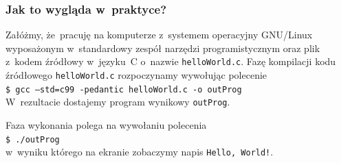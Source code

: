 \documentclass[10pt,t]{beamer}
\begin{document}
\begin{frame}
  \frametitle{Jak to wygląda w~praktyce?}


  Załóżmy, że~pracuję na komputerze z~systemem operacyjny GNU/Linux
  wyposażonym w~standardowy zespół narzędzi programistycznym oraz plik
  z~kodem źródłowy w~języku~C o~nazwie \texttt{helloWorld.c}. Fazę
  kompilacji kodu źródłowego \texttt{helloWorld.c} rozpoczynamy wywołując
  polecenie \\
  \texttt{\$ gcc --std=c99 -pedantic helloWorld.c -o outProg} \\
  W~rezultacie dostajemy program wynikowy \texttt{outProg}.

  Faza wykonania polega na wywołaniu polecenia \\
  \texttt{\$ ./outProg} \\
  w~wyniku którego na ekranie zobaczymy napis \texttt{Hello, World!}.

\end{frame}
\end{document}
